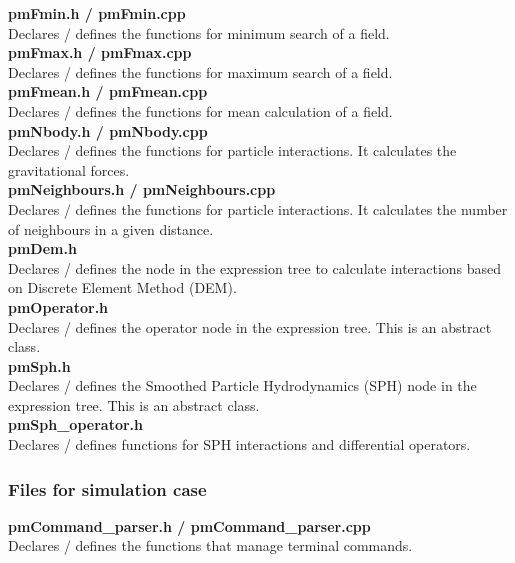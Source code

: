 \documentclass[a4paper,12pt,openany]{book}
\theoremstyle{break}
\begin{document}
\textbf{pmFmin.h / pmFmin.cpp} \\
Declares / defines the functions for minimum search of a field.  \\

\textbf{pmFmax.h / pmFmax.cpp} \\
Declares / defines the functions for maximum search of a field. \\

\textbf{pmFmean.h / pmFmean.cpp} \\
Declares / defines the functions for mean calculation of a field. \\

\textbf{pmNbody.h / pmNbody.cpp} \\
Declares / defines the functions for particle interactions. It calculates the gravitational forces. \\

\textbf{pmNeighbours.h / pmNeighbours.cpp} \\
Declares / defines the functions for particle interactions. It calculates the number of neighbours in a given distance. \\

\textbf{pmDem.h} \\
Declares / defines the node in the expression tree to calculate interactions based on Discrete Element Method (DEM). \\

\textbf{pmOperator.h} \\
Declares / defines the operator node in the expression tree. This is an abstract class. \\

\textbf{pmSph.h} \\
Declares / defines the Smoothed Particle Hydrodynamics (SPH) node in the expression tree. This is an abstract class. \\

\textbf{pmSph\_operator.h} \\
Declares / defines functions for SPH interactions and differential operators. \\

\subsubsection{Files for simulation case}

\textbf{pmCommand\_parser.h / pmCommand\_parser.cpp} \\
Declares / defines the functions that manage terminal commands. \\
\end{document}
